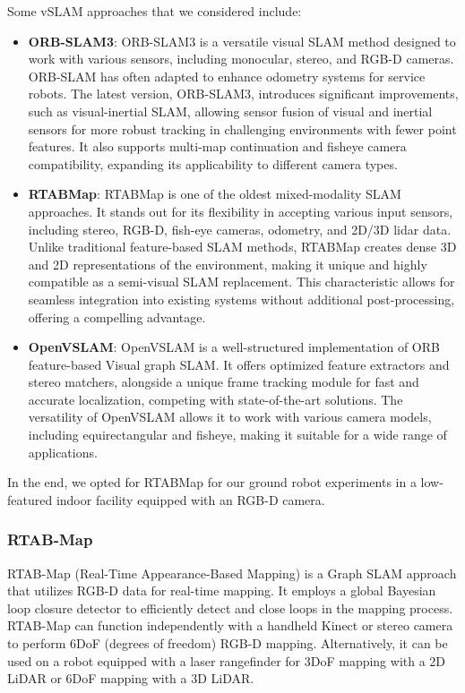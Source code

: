 Some vSLAM approaches that we considered include:
\begin{itemize}
    \item \textbf{ORB-SLAM3}: ORB-SLAM3 is a versatile visual SLAM method designed to work with various sensors, including monocular, stereo, and RGB-D cameras. ORB-SLAM has often adapted to enhance odometry systems for service robots. The latest version, ORB-SLAM3, introduces significant improvements, such as visual-inertial SLAM, allowing sensor fusion of visual and inertial sensors for more robust tracking in challenging environments with fewer point features. It also supports multi-map continuation and fisheye camera compatibility, expanding its applicability to different camera types.

    \item \textbf{RTABMap}: RTABMap is one of the oldest mixed-modality SLAM approaches. It stands out for its flexibility in accepting various input sensors, including stereo, RGB-D, fish-eye cameras, odometry, and 2D/3D lidar data. Unlike traditional feature-based SLAM methods, RTABMap creates dense 3D and 2D representations of the environment, making it unique and highly compatible as a semi-visual SLAM replacement. This characteristic allows for seamless integration into existing systems without additional post-processing, offering a compelling advantage.

    \item \textbf{OpenVSLAM}: OpenVSLAM is a well-structured implementation of ORB feature-based Visual graph SLAM. It offers optimized feature extractors and stereo matchers, alongside a unique frame tracking module for fast and accurate localization, competing with state-of-the-art solutions. The versatility of OpenVSLAM allows it to work with various camera models, including equirectangular and fisheye, making it suitable for a wide range of applications.
\end{itemize}

In the end, we opted for RTABMap for our ground robot experiments in a low-featured indoor facility equipped with an RGB-D camera. 

\subsubsection*{RTAB-Map}
RTAB-Map (Real-Time Appearance-Based Mapping) is a Graph SLAM approach that utilizes RGB-D data for real-time mapping. It employs a global Bayesian loop closure detector to efficiently detect and close loops in the mapping process. RTAB-Map can function independently with a handheld Kinect or stereo camera to perform 6DoF (degrees of freedom) RGB-D mapping. Alternatively, it can be used on a robot equipped with a laser rangefinder for 3DoF mapping with a 2D LiDAR or 6DoF mapping with a 3D LiDAR.\\

